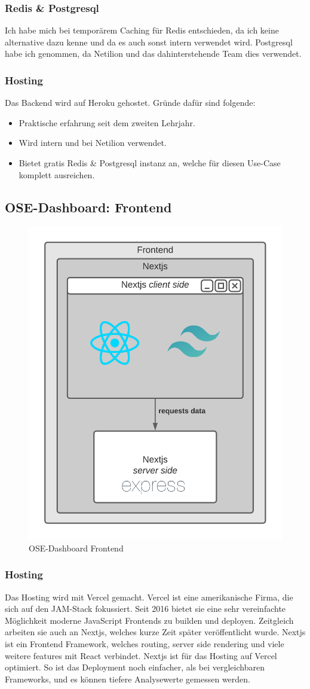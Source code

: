 \subsubsection{Redis \& Postgresql}
Ich habe mich bei temporärem Caching für Redis entschieden, da ich keine alternative dazu kenne und da es auch sonst intern verwendet wird. Postgresql habe ich genommen, da Netilion und das dahinterstehende Team dies verwendet.
\subsubsection{Hosting}
Das Backend wird auf Heroku gehostet. Gründe dafür sind folgende:
\begin{itemize}
  \item Praktische erfahrung seit dem zweiten Lehrjahr.
  \item Wird intern und bei Netilion verwendet.
  \item Bietet gratis Redis \& Postgresql instanz an, welche für diesen Use-Case komplett ausreichen.
\end{itemize}
\subsection{OSE-Dashboard: Frontend} \label{arch-frontend}
\begin{figure}[!ht]
  \centering
  \includegraphics[width=.4\linewidth]{./images/frontend.png}
  \caption[{Diagram OSE-Dashboard Frontend von Jonas Schultheiss}]{OSE-Dashboard Frontend}
  \label{fig:frontend}
\end{figure}
\subsubsection{Hosting}
Das Hosting wird mit Vercel gemacht. Vercel ist eine amerikanische Firma, die sich auf den JAM-Stack fokussiert. Seit 2016 bietet sie eine sehr vereinfachte Möglichkeit moderne JavaScript Frontends zu builden und deployen. Zeitgleich arbeiten sie auch an Nextjs, welches kurze Zeit später veröffentlicht wurde. Nextjs ist ein Frontend Framework, welches routing, server side rendering und viele weitere features mit React verbindet. Nextjs ist für das Hosting auf Vercel optimiert. So ist das Deployment noch einfacher, als bei vergleichbaren Frameworks, und es können tiefere Analysewerte gemessen werden.
